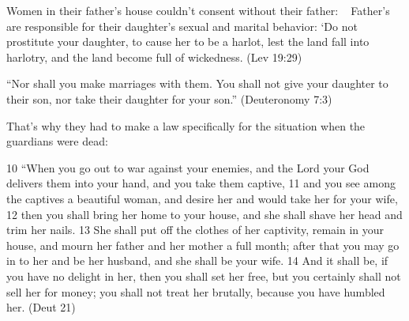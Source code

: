 \documentclass[11pt]{article}
\begin{document}
Women in their father’s house couldn't consent without their father: 
 
Father’s are responsible for their daughter’s sexual and marital behavior:
‘Do not prostitute your daughter, to cause her to be a harlot, lest the land fall into harlotry, and the land become full of wickedness. (Lev 19:29)


“Nor shall you make marriages with them. You shall not give your daughter to their son, nor take their daughter for your son.”
(Deuteronomy 7:3)


That’s why they had to make a law specifically for the situation when the guardians were dead:


10 “When you go out to war against your enemies, and the Lord your God delivers them into your hand, and you take them captive, 11 and you see among the captives a beautiful woman, and desire her and would take her for your wife, 12 then you shall bring her home to your house, and she shall shave her head and trim her nails. 13 She shall put off the clothes of her captivity, remain in your house, and mourn her father and her mother a full month; after that you may go in to her and be her husband, and she shall be your wife. 14 And it shall be, if you have no delight in her, then you shall set her free, but you certainly shall not sell her for money; you shall not treat her brutally, because you have humbled her. (Deut 21)
\end{document}
